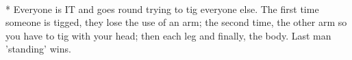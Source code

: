 \begin{minipage}{\textwidth}
\equip{}
\\*
Everyone is IT and goes round trying to tig everyone else. The first time someone is tigged, they lose the use of an arm; the second time, the other arm so you have to tig with your head; then each leg and finally, the body.  Last man 'standing' wins.
\end{minipage}    \vfill
